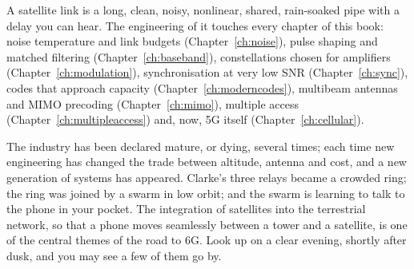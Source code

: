 
A satellite link is a long, clean, noisy, nonlinear, shared, rain-soaked pipe with a delay you can
hear. The engineering of it touches every chapter of this book: noise temperature and link
budgets (Chapter~\ref{ch:noise}), pulse shaping and matched filtering (Chapter~\ref{ch:baseband}),
constellations chosen for amplifiers (Chapter~\ref{ch:modulation}), synchronisation at very low SNR
(Chapter~\ref{ch:sync}), codes that approach capacity (Chapter~\ref{ch:moderncodes}), multibeam
antennas and MIMO precoding (Chapter~\ref{ch:mimo}), multiple access
(Chapter~\ref{ch:multipleaccess}) and, now, 5G itself (Chapter~\ref{ch:cellular}).

The industry has been declared mature, or dying, several times; each time new engineering has
changed the trade between altitude, antenna and cost, and a new generation of systems has
appeared. Clarke's three relays became a crowded ring; the ring was joined by a swarm in low orbit;
and the swarm is learning to talk to the phone in your pocket. The integration of satellites into
the terrestrial network, so that a phone moves seamlessly between a tower and a satellite, is one
of the central themes of the road to 6G. Look up on a clear evening, shortly after dusk, and you
may see a few of them go by.

